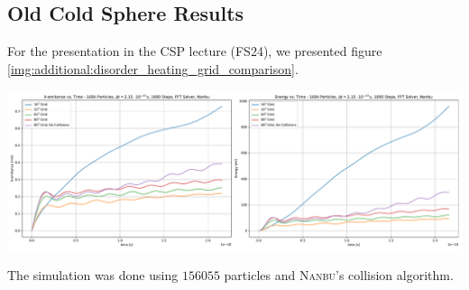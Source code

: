 \subsection{Old Cold Sphere Results}

For the presentation in the CSP lecture (FS24), we presented figure \ref{img:additional:disorder_heating_grid_comparison}. \\
\begin{minipage}[h]{\linewidth}
    \vspace{5pt}
    \centering
    \includegraphics[width=\linewidth]{ressources/additional/disorder_heating_grid_comparison.pdf}
    \label{img:additional:disorder_heating_grid_comparison}
    \vspace{5pt}
\end{minipage}
The simulation was done using $156055$ particles and \textsc{Nanbu}'s collision algorithm.
